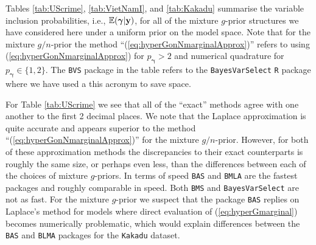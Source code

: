 \documentclass[12pt]{article}
\def\vectorfontone{\bf}
\def\vectorfonttwo{\boldsymbol}
\def\vy{{\vectorfontone y}}                      %
\def\vgamma{{\vectorfonttwo \gamma}}             %
\def\bE{{\mathbb E}}                             %
\begin{document}
Tables \ref{tab:UScrime}, \ref{tab:VietNamI}, and \ref{tab:Kakadu} summarise the variable 
inclusion probabilities, i.e., $\bE(\vgamma|\vy)$, for all of the mixture $g$-prior structures we have considered here under a uniform prior
on the model space. Note that for the mixture $g/n$-prior the method ``(\ref{eq:hyperGonNmarginalApprox})''
refers to using (\ref{eq:hyperGonNmarginalApprox}) for $p_\vgamma >2$ and numerical quadrature for $p_\vgamma \in \{ 1,2\}$. The {\tt BVS} package in the table refers to the {\tt BayesVarSelect} {\tt R} package where we have used a this acronym to save space. 

For Table \ref{tab:UScrime} we see that all of the ``exact'' methods agree with one another to the first 2 decimal 
places. We note that the Laplace approximation is quite accurate and appears superior to  the method
``(\ref{eq:hyperGonNmarginalApprox})'' for the mixture $g/n$-prior. However, for both of these approximation
methods the discrepancies to their exact counterparts is roughly the same size, or perhaps even less, than
the differences between each of the choices of mixture $g$-priors. In terms of speed {\tt BAS} and {\tt BMLA} are
the fastest packages and roughly comparable in speed. Both {\tt BMS} and {\tt BayesVarSelect} are not as fast.
For the mixture $g$-prior we suspect that the package {\tt BAS} replies on Laplace's method for models
where direct evaluation of (\ref{eq:hyperGmarginal}) becomes numerically problematic, which would explain
differences between the {\tt BAS} and {\tt BLMA} packages for the {\tt Kakadu} dataset.

 
\end{document}
